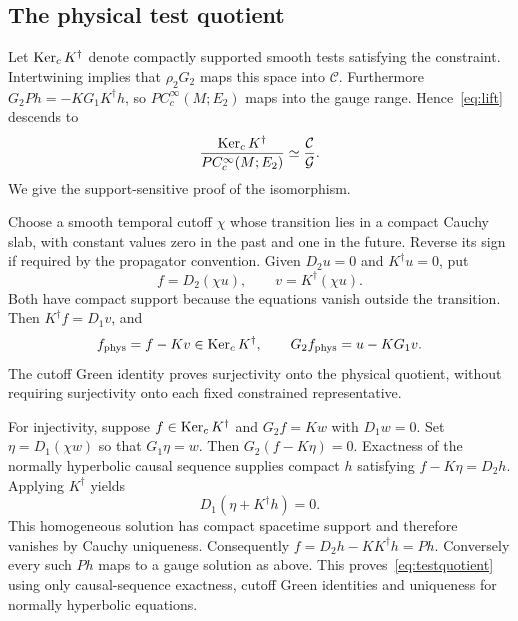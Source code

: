 \subsection{The physical test quotient}
Let $\operatorname{Ker}_cK^\dagger$ denote compactly supported smooth tests satisfying the constraint.
Intertwining implies that $\rho_2G_2$ maps this space into $\mathcal C$.
Furthermore $G_2Ph=-KG_1K^\dagger h$, so $P C_c^\infty(M;E_2)$ maps into the gauge range.
Hence~\eqref{eq:lift} descends to
\begin{equation}\label{eq:testquotient}
\frac{\operatorname{Ker}_cK^\dagger}{P C_c^\infty(M;E_2)}
\simeq\frac{\mathcal C}{\mathcal G}.
\end{equation}
We give the support-sensitive proof of the isomorphism.

Choose a smooth temporal cutoff $\chi$ whose transition lies in a compact Cauchy slab, with constant values zero in the past and one in the future.
Reverse its sign if required by the propagator convention.
Given $D_2u=0$ and $K^\dagger u=0$, put
\[
f=D_2(\chi u),\qquad v=K^\dagger(\chi u).
\]
Both have compact support because the equations vanish outside the transition.
Then $K^\dagger f=D_1v$, and
\[
f_{\mathrm{phys}}=f-Kv\in\operatorname{Ker}_cK^\dagger,
\qquad G_2f_{\mathrm{phys}}=u-KG_1v.
\]
The cutoff Green identity proves surjectivity onto the physical quotient, without requiring surjectivity onto each fixed constrained representative.

For injectivity, suppose $f\in\operatorname{Ker}_cK^\dagger$ and $G_2f=Kw$ with $D_1w=0$.
Set $\eta=D_1(\chi w)$ so that $G_1\eta=w$.
Then $G_2(f-K\eta)=0$.
Exactness of the normally hyperbolic causal sequence supplies compact $h$ satisfying $f-K\eta=D_2h$.
Applying $K^\dagger$ yields
\[
D_1(\eta+K^\dagger h)=0.
\]
This homogeneous solution has compact spacetime support and therefore vanishes by Cauchy uniqueness.
Consequently $f=D_2h-KK^\dagger h=Ph$.
Conversely every such $Ph$ maps to a gauge solution as above.
This proves~\eqref{eq:testquotient} using only causal-sequence exactness, cutoff Green identities and uniqueness for normally hyperbolic equations.

